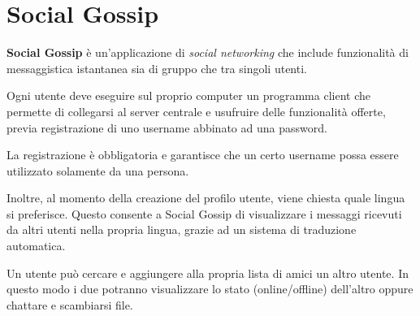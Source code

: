 \section{Social Gossip}
\textbf{Social Gossip} è un'applicazione di \textit{social networking} che include funzionalità di messaggistica istantanea sia di gruppo che tra singoli utenti.

Ogni utente deve eseguire sul proprio computer un programma client che permette di collegarsi al server centrale e usufruire delle funzionalità offerte, previa registrazione di uno username abbinato ad una password.

La registrazione è obbligatoria e garantisce che un certo username possa essere utilizzato solamente da una persona.

\medskip 
\noindent Inoltre, al momento della creazione del profilo utente, viene chiesta quale lingua si preferisce. Questo consente a Social Gossip di visualizzare i messaggi ricevuti da altri utenti nella propria lingua, grazie ad un sistema di traduzione automatica.

Un utente può cercare e aggiungere alla propria lista di amici un altro utente. In questo modo i due potranno visualizzare lo stato (online/offline) dell'altro oppure chattare e scambiarsi file.